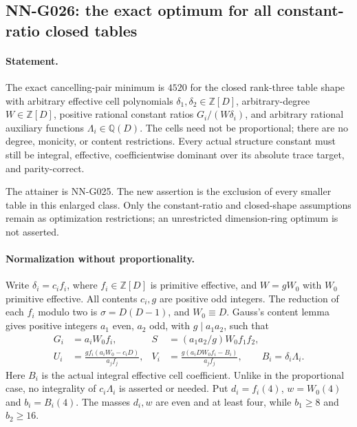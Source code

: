 \subsection{NN-G026: the exact optimum for all constant-ratio closed tables}
\paragraph{Statement.}
The exact cancelling-pair minimum is $4520$ for the closed
rank-three table shape with arbitrary effective cell polynomials
$\delta_1,\delta_2\in\mathbb Z[D]$, arbitrary-degree
$W\in\mathbb Z[D]$, positive rational constant ratios
$G_i/(W\delta_i)$, and arbitrary rational auxiliary functions
$\Lambda_i\in\mathbb Q(D)$. The cells need not be proportional;
there are no degree, monicity, or content restrictions.
Every actual structure constant must still be integral,
effective, coefficientwise dominant over its absolute trace
target, and parity-correct.

The attainer is NN-G025. The new assertion is the exclusion
of every smaller table in this enlarged class. Only the
constant-ratio and closed-shape assumptions remain as
optimization restrictions; an unrestricted dimension-ring
optimum is not asserted.

\paragraph{Normalization without proportionality.}
Write $\delta_i=c_i f_i$, where $f_i\in\mathbb Z[D]$
is primitive effective, and $W=gW_0$ with $W_0$ primitive
effective. All contents $c_i,g$ are positive odd integers.
The reduction of each $f_i$ modulo two is
$\sigma=D(D-1)$, and $W_0\equiv D$.
Gauss's content lemma gives positive integers $a_1$ even,
$a_2$ odd, with $g\mid a_1a_2$, such that
\[
 \begin{aligned}
 G_i&=a_iW_0f_i,&S&=(a_1a_2/g)W_0f_1f_2,\\
 U_i&=\frac{g f_i(a_iW_0-c_iD)}{a_j f_j},&
 V_i&=\frac{g(a_iDW_0f_i-B_i)}{a_j f_j},
 \qquad B_i=\delta_i\Lambda_i.
 \end{aligned}                                                       \tag{G026.1}
\]
Here $B_i$ is the actual integral effective cell coefficient.
Unlike in the proportional case, no integrality of
$c_i\Lambda_i$ is asserted or needed.
Put $d_i=f_i(4)$, $w=W_0(4)$ and $b_i=B_i(4)$.
The masses $d_i,w$ are even and at least four, while
$b_1\ge8$ and $b_2\ge16$.

